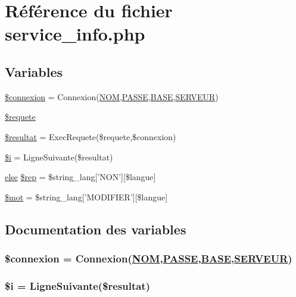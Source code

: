 \hypertarget{service__info_8php}{
\section{R\'{e}f\'{e}rence du fichier service\_\-info.php}
\label{service__info_8php}
}
\subsection*{Variables}
\begin{CompactItemize}
\item 
\hyperlink{service__info_8php_a0}{\$connexion} = Connexion(\hyperlink{pma__connect_8php_a0}{NOM},\hyperlink{pma__connect_8php_a1}{PASSE},\hyperlink{pma__connect_8php_a3}{BASE},\hyperlink{pma__connect_8php_a2}{SERVEUR})
\item 
\hyperlink{service__info_8php_a1}{\$requete}
\item 
\hyperlink{service__info_8php_a2}{\$resultat} = Exec\-Requete(\$requete,\$connexion)
\item 
\hyperlink{service__info_8php_a3}{\$i} = Ligne\-Suivante(\$resultat)
\item 
\hyperlink{cron_8php_a9}{else} \hyperlink{service__info_8php_a4}{\$rep} = \$string\_\-lang\mbox{[}'NON'\mbox{]}\mbox{[}\$langue\mbox{]}
\item 
\hyperlink{service__info_8php_a5}{\$mot} = \$string\_\-lang\mbox{[}'MODIFIER'\mbox{]}\mbox{[}\$langue\mbox{]}
\end{CompactItemize}


\subsection{Documentation des variables}
\hypertarget{service__info_8php_a0}{
\subsubsection[\$connexion]{\setlength{\rightskip}{0pt plus 5cm}\$connexion = Connexion(\hyperlink{pma__connect_8php_a0}{NOM},\hyperlink{pma__connect_8php_a1}{PASSE},\hyperlink{pma__connect_8php_a3}{BASE},\hyperlink{pma__connect_8php_a2}{SERVEUR})}}
\label{service__info_8php_a0}


\hypertarget{service__info_8php_a3}{
\subsubsection[\$i]{\setlength{\rightskip}{0pt plus 5cm}\$i = Ligne\-Suivante(\$resultat)}}
\label{service__info_8php_a3}



